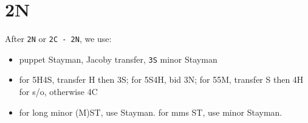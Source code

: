\section{2N}

After \texttt{2N} or \texttt{2C - 2N}, we use:
\begin{itemize}
  \setlength\itemsep{0pt}
  \item puppet Stayman, Jacoby transfer, \texttt{3S} minor Stayman
  \item for 5H4S, transfer H then 3S; for 5S4H, bid 3N; for 55M, transfer S then 4H for s/o, otherwise 4C
  \item for long minor (M)ST, use Stayman. for mms ST, use minor Stayman.
\end{itemize}






